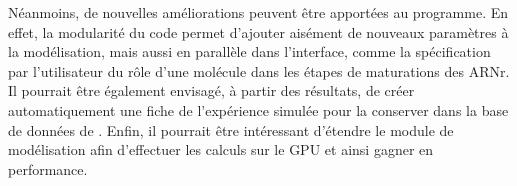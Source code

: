 Néanmoins, de nouvelles améliorations peuvent être apportées au
programme. En effet, la modularité du code permet d'ajouter aisément
de nouveaux paramètres à la modélisation, mais aussi en parallèle dans
l'interface, comme la spécification par l'utilisateur du rôle d'une
molécule dans les étapes de maturations des ARNr. Il pourrait être
également envisagé, à partir des résultats, de créer automatiquement
une \og{} fiche \fg{} de l'expérience simulée pour la conserver dans
la base de données de \NQ. Enfin, il pourrait être intéressant
d'étendre le module de modélisation afin d'effectuer les calculs sur
le GPU et ainsi gagner en performance.


